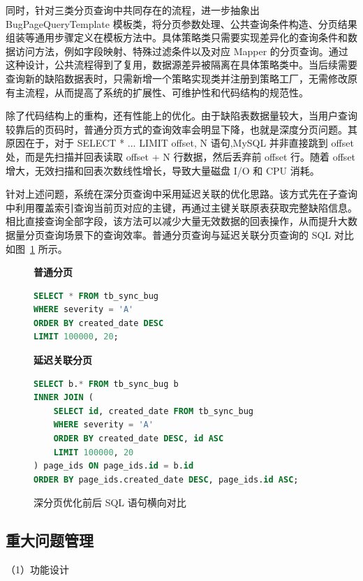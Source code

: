 同时，针对三类分页查询中共同存在的流程，进一步抽象出 BugPageQueryTemplate 模板类，将分页参数处理、公共查询条件构造、分页结果组装等通用步骤定义在模板方法中。具体策略类只需要实现差异化的查询条件和数据访问方法，例如字段映射、特殊过滤条件以及对应 Mapper 的分页查询。通过这种设计，公共流程得到了复用，数据源差异被隔离在具体策略类中。当后续需要查询新的缺陷数据表时，只需新增一个策略实现类并注册到策略工厂，无需修改原有主流程，从而提高了系统的扩展性、可维护性和代码结构的规范性。

除了代码结构上的重构，还有性能上的优化。由于缺陷表数据量较大，当用户查询较靠后的页码时，普通分页方式的查询效率会明显下降，也就是深度分页问题。其原因在于，对于 SELECT * ... LIMIT offset, N 语句,MySQL 并非直接跳到 offset 处，而是先扫描并回表读取 offset + N 行数据，然后丢弃前 offset 行。随着 offset 增大，无效扫描和回表次数线性增长，导致大量磁盘 I/O 和 CPU 消耗\cite{botros2021highperformance}。

针对上述问题，系统在深分页查询中采用延迟关联的优化思路。该方式先在子查询中利用覆盖索引查询当前页对应的主键，再通过主键关联原表获取完整缺陷信息。相比直接查询全部字段，该方法可以减少大量无效数据的回表操作，从而提升大数据量分页查询场景下的查询效率。普通分页查询与延迟关联分页查询的 SQL 对比如图~\ref{fig:sql-optimization-compare} 所示。
\begin{figure}[htbp]
\centering
\begin{minipage}[t]{0.45\textwidth}
\textbf{普通分页}
\begin{lstlisting}[language=SQL, frame=single, basicstyle=\ttfamily\small, breaklines=true, tabsize=4]
SELECT * FROM tb_sync_bug
WHERE severity = 'A'
ORDER BY created_date DESC
LIMIT 100000, 20;
\end{lstlisting}
\end{minipage}
\hfill
\begin{minipage}[t]{0.45\textwidth}
\textbf{延迟关联分页}
\begin{lstlisting}[language=SQL, frame=single, basicstyle=\ttfamily\small, breaklines=true, tabsize=4]
SELECT b.* FROM tb_sync_bug b
INNER JOIN (
	SELECT id, created_date FROM tb_sync_bug
	WHERE severity = 'A'
	ORDER BY created_date DESC, id ASC
	LIMIT 100000, 20
) page_ids ON page_ids.id = b.id
ORDER BY page_ids.created_date DESC, page_ids.id ASC;
\end{lstlisting}
	\end{minipage}
	\caption{深分页优化前后 SQL 语句横向对比}
	\label{fig:sql-optimization-compare}
\end{figure}

\subsection{重大问题管理}
（1）功能设计

